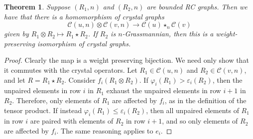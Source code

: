 \documentclass{amsart}
\newtheorem{theorem}{Theorem}[section]
\theoremstyle{definition}
\theoremstyle{remark}
\numberwithin{equation}{subsection}
\newcommand{\wof}[1]{w_{#1}}
\newcommand{\rcdd}{\mathfrak{F}}
\newcommand{\maxd}{\mathfrak{m}}
\begin{document}







\begin{theorem} \label{theorem:starproductcrystal}
  Suppose $(R_1,n)$ and $(R_2,n)$ are bounded RC graphs. Then we have that there is a homomorphism of crystal graphs
  $$\mathscr{C}(u,n)\otimes\mathscr{C}(v,n)\to \mathscr{C}(u) \star_n \mathscr{C}(v) $$
   given by $R_1\otimes R_2 \mapsto R_1\star R_2$. If $R_2$ is $n$-Grassmannian, then this is a weight-preserving isomorphism of crystal graphs.
\end{theorem}
\begin{proof}
Clearly the map is a weight preserving bijection. We need only show that it commutes with the crystal operators. Let $R_1\in \mathscr{C}(u,n)$ and $R_2\in \mathscr{C}(v,n)$, and let $R=R_1\star R_2$. Consider $f_i(R_1\otimes R_2)$. If $\varphi_i(R_1)>\varepsilon_i(R_2)$, then the unpaired elements in row $i$ in $R_1$ exhaust the unpaired elements in row $i+1$ in $R_2$. Therefore, only elements of $R_1$ are affected by $f_i$, as in the definition of the tensor product. If instead $\varphi_i(R_1)\leq \varepsilon_i(R_2)$, then all unpaired elements of $R_1$ in row $i$ are paired with elements of $R_2$ in row $i+1$, and so only elements of $R_2$ are affected by $f_i$. The same reasoning applies to $e_i$.
\end{proof}
\end{document}

